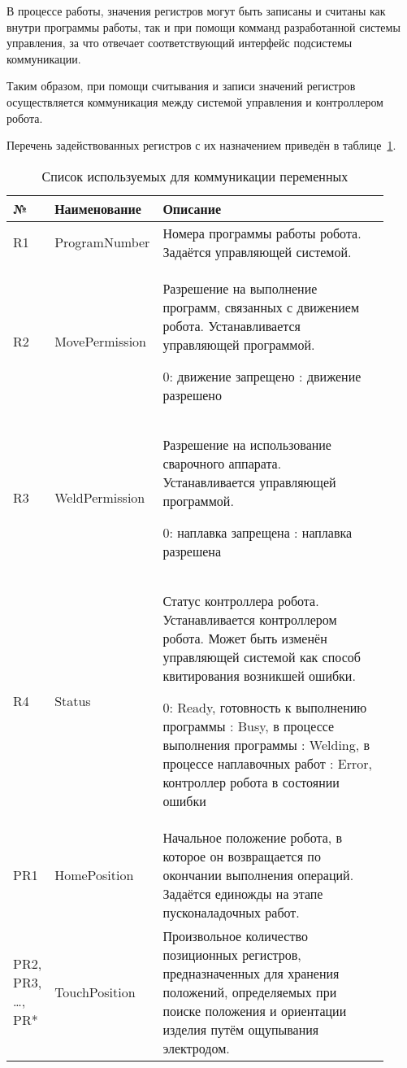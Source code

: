 В процессе работы, значения регистров могут быть записаны и считаны как внутри программы работы, так и при помощи комманд разработанной системы управления, за что отвечает соответствующий интерфейс подсистемы коммуникации.

Таким образом, при помощи считывания и записи значений регистров осуществляется коммуникация между системой управления и контроллером робота.

Перечень задействованных регистров с их назначением приведён в таблице~\ref{tab:Software:VariablesMap}.

\begin{longtable}[H]{|p{0.06\linewidth}|p{0.22\linewidth}|p{0.64\linewidth}|}
    \caption{Список используемых для коммуникации переменных}
    \label{tab:Software:VariablesMap}
    \\ \hline
    № & Наименование & Описание \\ \hline

    R1 & ProgramNumber & Номера программы работы робота.
    Задаётся управляющей системой. \\ \hline

    R2 & MovePermission & Разрешение на выполнение программ, связанных с движением робота.
    Устанавливается управляющей программой. \newline

    0: движение запрещено \newline
    1: движение разрешено \\ \hline

    R3 & WeldPermission & Разрешение на использование сварочного аппарата.
    Устанавливается управляющей программой. \newline

    0: наплавка запрещена \newline
    1: наплавка разрешена \\ \hline

    R4 & Status & Статус контроллера робота.
    Устанавливается контроллером робота.
    Может быть изменён управляющей системой как способ квитирования возникшей ошибки. \newline

    0: Ready, готовность к выполнению программы \newline
    1: Busy, в процессе выполнения программы \newline
    2: Welding, в процессе наплавочных работ \newline
    3: Error, контроллер робота в состоянии ошибки \\ \hline

    PR1 & HomePosition & Начальное положение робота, в которое он возвращается по окончании выполнения операций.
    Задаётся единожды на этапе пусконаладочных работ. \\ \hline

    PR2, PR3, \ldots, PR* & TouchPosition & Произвольное количество позиционных регистров, предназначенных для хранения положений, определяемых при поиске положения и ориентации изделия путём ощупывания электродом. \\ \hline
\end{longtable}


